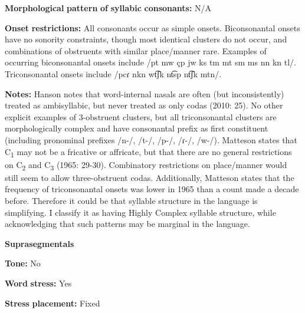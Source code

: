 \documentclass[output=paper]{langsci/langscibook}
\begin{document}
\begin{styleBody}
\textbf{Morphological} \textbf{pattern} \textbf{of} \textbf{syllabic} \textbf{consonants:} N/A
\end{styleBody}

\begin{styleBody}
\textbf{Onset} \textbf{restrictions:} All consonants occur as simple onsets. Biconsonantal onsets have no sonority constraints, though most identical clusters do not occur, and combinations of obstruents with similar place/manner rare. Examples of occurring biconsonantal onsets include /pt mw çp jw ks tm mt sm ms nn kn tl/. Triconsonantal onsets include /pcɾ nkn wt͡ʃk nt͡sp nt͡ʃk mtn/.
\end{styleBody}

\begin{styleBody}
\textbf{Notes:} Hanson notes that word-internal nasals are often (but inconsistently) treated as ambisyllabic, but never treated as only codas (2010: 25). No other explicit examples of 3-obstruent clusters, but all triconsonantal clusters are morphologically complex and have consonantal prefix as first constituent (including pronominal prefixes /n-/, /t-/, /p-/, /ɾ{}-/, /w-/). Matteson states that C\textsubscript{1} may not be a fricative or affricate, but that there are no general restrictions on C\textsubscript{2} and C\textsubscript{3} (1965: 29-30). Combinatory restrictions on place/manner would still seem to allow three-obstruent codas. Additionally, Matteson states that the frequency of triconsonantal onsets was lower in 1965 than a count made a decade before. Therefore it could be that syllable structure in the language is simplifying. I classify it as having Highly Complex syllable structure, while acknowledging that such patterns may be marginal in the language.
\end{styleBody}

\begin{styleBody}
\textbf{Suprasegmentals}
\end{styleBody}

\begin{styleBody}
\textbf{Tone:} No
\end{styleBody}

\begin{styleBody}
\textbf{Word} \textbf{stress:} Yes
\end{styleBody}

\begin{styleBody}
\textbf{Stress} \textbf{placement:} Fixed
\end{styleBody}
\end{document}
